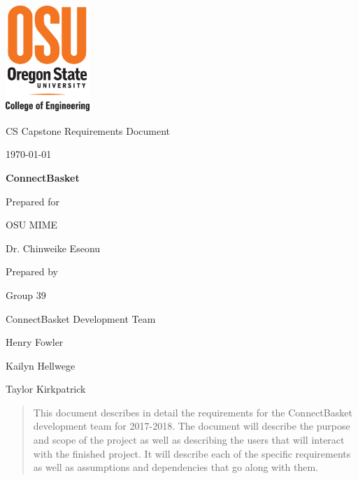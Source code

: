 \documentclass[onecolumn, draftclsnofoot,10pt, compsoc]{IEEEtran}
\def \CapstoneTeamName{		ConnectBasket Development Team}
\def \CapstoneTeamNumber{		39}
\def \GroupMemberOne{			Henry Fowler}
\def \GroupMemberTwo{			Kailyn Hellwege}
\def \GroupMemberThree{			Taylor Kirkpatrick}
\def \CapstoneProjectName{		ConnectBasket}
\def \CapstoneSponsorCompany{	OSU MIME}
\def \CapstoneSponsorPerson{		Dr. Chinweike Eseonu}
\def \DocType{		%
				Requirements Document
				}
\newcommand{\NameSigPair}[1]{\par
\makebox[2.75in][r]{#1} \hfil 	\makebox[3.25in]{\makebox[2.25in]{\hrulefill} \hfill		\makebox[.75in]{\hrulefill}}
\par\vspace{-12pt} \textit{\tiny\noindent
\makebox[2.75in]{} \hfil		\makebox[3.25in]{\makebox[2.25in][r]{Signature} \hfill	\makebox[.75in][r]{Date}}}}
\renewcommand{\NameSigPair}[1]{#1}
\begin{document}
\begin{titlepage}
    \begin{singlespace}
    	\includegraphics[height=4cm]{coe_v_spot1}
        \hfill 
        \par\vspace{.2in}
        \centering
        \scshape{
            \huge CS Capstone \DocType \par
            {\large\today}\par
            \vspace{.5in}
            \textbf{\Huge\CapstoneProjectName}\par
            \vfill
            {\large Prepared for}\par
            \Huge \CapstoneSponsorCompany\par
            \vspace{5pt}
            {\Large\NameSigPair{\CapstoneSponsorPerson}\par}
            {\large Prepared by }\par
            Group\CapstoneTeamNumber\par
            \CapstoneTeamName\par 
            \vspace{5pt}
            {\Large
                \NameSigPair{\GroupMemberOne}\par
                \NameSigPair{\GroupMemberTwo}\par
                \NameSigPair{\GroupMemberThree}\par
            }
            \vspace{20pt}
        }
        \begin{abstract}
        This document describes in detail the requirements for the ConnectBasket development team for 2017-2018. The document will describe the purpose and scope of the project as well as describing the users that will interact with the finished project. It will describe each of the specific requirements as well as assumptions and dependencies that go along with them.
        \end{abstract}     
    \end{singlespace}
\end{titlepage}
\newpage
{}
\tableofcontents
\clearpage
\end{document}
